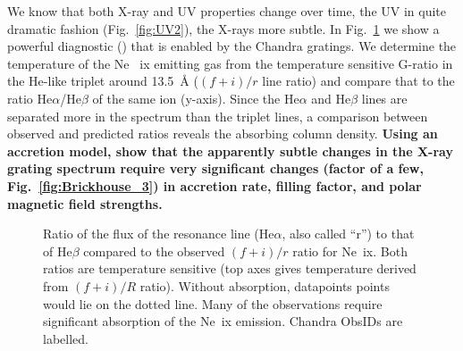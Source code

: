 \documentclass[letterpaper,11pt,twocolumn]{article}
\begin{document}
We know that both X-ray and UV properties change over time, the UV in
quite dramatic fashion (Fig.~\ref{fig:UV2}), the X-rays more
subtle. In Fig.~\ref{fig:allspec} we show a powerful diagnostic
() that is enabled by the Chandra
gratings. We determine the temperature of the Ne~{\sc
  ix} emitting gas from the temperature sensitive G-ratio in the He-like triplet around 13.5~\AA{} ($(f+i)/r$ line ratio) and
compare that to the ratio He$\alpha$/He$\beta$ of the same ion
(y-axis). Since the He$\alpha$ and He$\beta$ lines are separated more
in the spectrum than the triplet lines, a comparison between observed
and predicted ratios reveals the absorbing column
density. \textbf{Using an accretion model, \citet{2012ApJ...760L..21B}
  show that the apparently subtle changes in the X-ray grating
  spectrum require very significant changes (factor of a few,
  Fig.~\ref{fig:Brickhouse_3}) in accretion rate, filling factor, and
  polar magnetic field strengths. }

\begin{figure}[h!]
\centering
{}
\caption{Ratio of the flux of the resonance line (He$\alpha$, also
  called ``r'') to that of He$\beta$ compared to the observed
  $(f+i)/r$ ratio for Ne~{\sc ix}. Both ratios are temperature
  sensitive (top axes gives temperature derived from $(f+i)/R$
  ratio). Without absorption, datapoints points would lie on the
  dotted line.  Many of the observations require significant
  absorption of the Ne~{\sc ix} emission. Chandra ObsIDs are labelled.
\label{fig:allspec} }
\end{figure}
\end{document}
